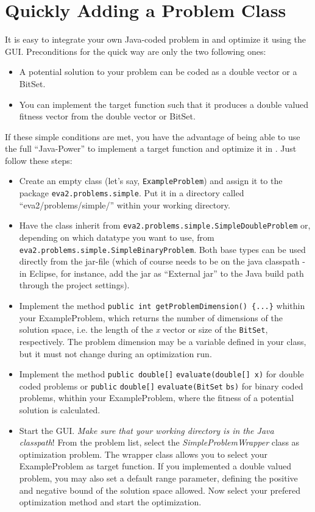 \chapter{Quickly Adding a Problem Class\label{sec:Quickly-Adding-Your-Problem}}

It is easy to integrate your own Java-coded problem in 
and optimize it using the GUI. Preconditions for the quick way are
only the two following ones:
\begin{itemize}
\item A potential solution to your problem can be coded as a double vector
or a BitSet.
\item You can implement the target function such that it produces a double
valued fitness vector from the double vector or BitSet.
\end{itemize}
If these simple conditions are met, you have the advantage of being
able to use the full ``Java-Power'' to implement a target function
and optimize it in . Just follow these steps:
\begin{itemize}
\item Create an empty class (let's say, \texttt{ExampleProblem}) and assign
it to the package \texttt{eva2.problems.simple}. Put it in a directory called
``eva2/problems/simple/'' within your working directory.
\item Have the class inherit from \texttt{eva2.problems.simple.SimpleDoubleProblem}
or, depending on which datatype you want to use, from \texttt{eva2.problems.simple.Simple\-Binary\-Problem}.
Both base types can be used directly from the  jar-file
(which of course needs to be on the java classpath - in Eclipse, for
instance, add the  jar as ``External jar'' to the Java
build path through the project settings).
\item Implement the method \texttt{public int getProblemDimension() \{...\}}
whithin your ExampleProblem, which returns the number of dimensions
of the solution space, i.e. the length of the \emph{x} vector or size
of the \texttt{BitSet}, respectively. The problem dimension may be
a variable defined in your class, but it must not change during an
optimization run.
\item Implement the method \texttt{public double{[}{]}} \texttt{evaluate(double{[}{]}
x)} for double coded problems or \texttt{public} \texttt{double{[}{]}}
\texttt{evaluate(BitSet} \texttt{bs)} for binary coded problems, whithin
your ExampleProblem, where the fitness of a potential solution is
calculated.
\item Start the  GUI. \emph{Make sure that your working directory
is in the Java classpath}! From the problem list, select the \emph{SimpleProblemWrapper}
class as optimization problem. The wrapper class allows you to select
your ExampleProblem as target function. If you implemented a double
valued problem, you may also set a default range parameter, defining
the positive and negative bound of the solution space allowed. Now
select your prefered optimization method and start the optimization.
\end{itemize}